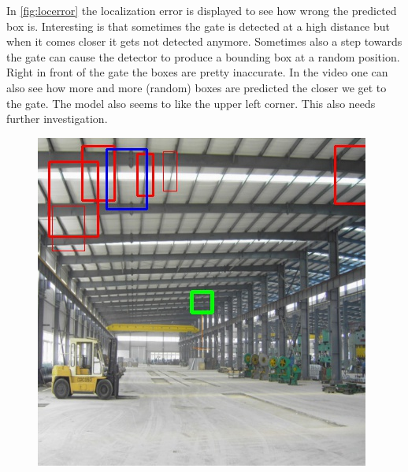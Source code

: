 \documentclass{article}
\begin{document}
In \autoref{fig:locerror} the localization error is displayed to see how wrong the predicted box is. Interesting is that sometimes the gate is detected at a high distance but when it comes closer it gets not detected anymore. Sometimes also a step towards the gate can cause the detector to produce a bounding box at a random position. Right in front of the gate the boxes are pretty inaccurate. In the video one can also see how more and more (random) boxes are predicted the closer we get to the gate. The model also seems to like the upper left corner. This also needs further investigation.

\begin{figure}[h]
	\centering
	\begin{minipage}{0.25\textwidth}
		\centering
		\includegraphics[width=\textwidth]{../fig/stream1}
			

\end{minipage}
\end{figure}
\end{document}
